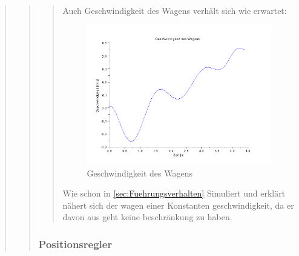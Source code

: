 \begin{quote}
\begin{quote}
\begin{quote}
            \vspace{2em}
            
            Auch Geschwindigkeit des Wagens verhält sich wie erwartet:
            
            \begin{figure}[H]
            \centering
                \includegraphics[scale=0.7, trim = 0cm 0cm 0cm 0cm, clip]{Bilder/win_gesch}
                    \caption{Geschwindigkeit des Wagens}
                    \label{fig:win_gesch}
            \end{figure}
            
            Wie schon in \ref{sec:Fuehrungsverhalten} Simuliert und erklärt nähert sich der wagen einer Konstanten
            geschwindigkeit, da er davon aus geht keine beschränkung zu haben. 
            
            
            
        \end{quote}%
        
        \subsubsection{Positionsregler}
        \begin{quote}
            
            
            

\end{quote}
\end{quote}
\end{quote}
